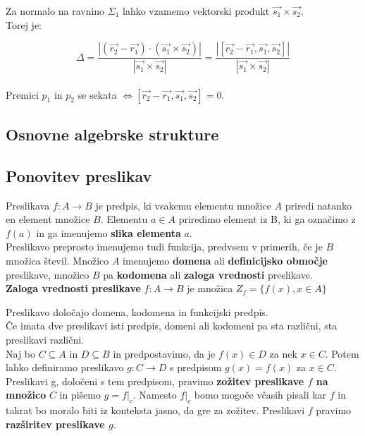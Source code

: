 \documentclass[a4paper,12pt]{article}
\begin{document}
\begin{itemize}
Za normalo na ravnino $\Sigma_1$ lahko vzamemo vektorski produkt $\vec{s_1} \times \vec{s_2}$. \\

Torej je: 

$$ \Delta = \frac{|(\vec{r_2}-\vec{r_1})\cdot(\vec{s_1} \times \vec{s_2})|}{|\vec{s_1} \times \vec{s_2}|} = \frac{|[\vec{r_2}-\vec{r_1},\vec{s_1},\vec{s_2}]|}{|\vec{s_1} \times \vec{s_2}|} $$ \\

Premici $p_1$ in $p_2$ se sekata $\Leftrightarrow [\vec{r_2}-\vec{r_1},\vec{s_1},\vec{s_2}]=0$.

\end{itemize}


\newpage

\begin{center}
\section{Osnovne algebrske strukture}
\subsection{Ponovitev preslikav}
\end{center}

Preslikava $ f: A \to B $ je predpis, ki vsakemu elementu množice $A$ priredi natanko en element množice $B$. Elementu $a \in A$ priredimo element iz B, ki ga označimo z $f(a)$ in ga imenujemo \textbf{slika elementa} $a$. \\

Preslikavo preprosto imenujemo tudi funkcija, predvsem v primerih, če je $B$  množica števil. Množico $A$ imenujemo \textbf{domena} ali \textbf{definicijsko območje} preslikave, množico $B$ pa \textbf{kodomena} ali \textbf{zaloga vrednosti} preslikave. \\

\textbf{Zaloga vrednosti preslikave} $f: A \rightarrow B$ je množica $Z_f = \{f(x), x \in A\}$ 

Preslikavo določajo domena, kodomena in funkcijski predpis.\\

Če imata dve preslikavi isti predpis, domeni ali kodomeni pa sta različni, sta preslikavi različni. \\

Naj bo $C \subseteq A$ in $D \subseteq B$ in predpostavimo, da je $f(x) \in D$ za nek $x \in C$. Potem lahko definiramo preslikavo $g: C \to D$ s predpisom $g(x) = f(x)$ za $x \in C$. Preslikavi g, določeni s tem predpisom, pravimo \textbf{zožitev preslikave $f$ na množico} $C$ in pišemo $g = f|_c$. Namesto $f|_c$ bomo mogoče včasih pisali kar $f$ in takrat bo moralo biti iz konteksta jasno, da gre za zožitev. Preslikavi $f$ pravimo \textbf{razširitev preslikave $g$}. \\
\end{document}

